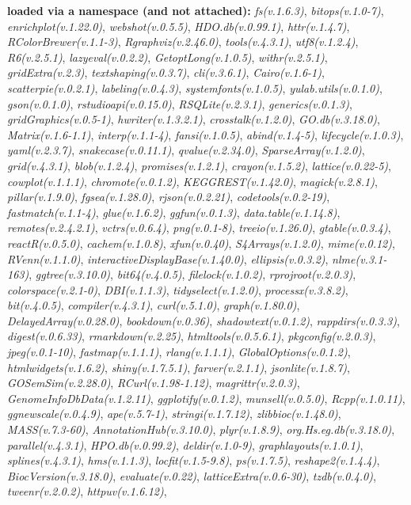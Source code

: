 \documentclass[
]{book}
\begin{document}
\textbf{loaded via a namespace (and not attached):}
\emph{fs(v.1.6.3)}, \emph{bitops(v.1.0-7)}, \emph{enrichplot(v.1.22.0)}, \emph{webshot(v.0.5.5)}, \emph{HDO.db(v.0.99.1)}, \emph{httr(v.1.4.7)}, \emph{RColorBrewer(v.1.1-3)}, \emph{Rgraphviz(v.2.46.0)}, \emph{tools(v.4.3.1)}, \emph{utf8(v.1.2.4)}, \emph{R6(v.2.5.1)}, \emph{lazyeval(v.0.2.2)}, \emph{GetoptLong(v.1.0.5)}, \emph{withr(v.2.5.1)}, \emph{gridExtra(v.2.3)}, \emph{textshaping(v.0.3.7)}, \emph{cli(v.3.6.1)}, \emph{Cairo(v.1.6-1)}, \emph{scatterpie(v.0.2.1)}, \emph{labeling(v.0.4.3)}, \emph{systemfonts(v.1.0.5)}, \emph{yulab.utils(v.0.1.0)}, \emph{gson(v.0.1.0)}, \emph{rstudioapi(v.0.15.0)}, \emph{RSQLite(v.2.3.1)}, \emph{generics(v.0.1.3)}, \emph{gridGraphics(v.0.5-1)}, \emph{hwriter(v.1.3.2.1)}, \emph{crosstalk(v.1.2.0)}, \emph{GO.db(v.3.18.0)}, \emph{Matrix(v.1.6-1.1)}, \emph{interp(v.1.1-4)}, \emph{fansi(v.1.0.5)}, \emph{abind(v.1.4-5)}, \emph{lifecycle(v.1.0.3)}, \emph{yaml(v.2.3.7)}, \emph{snakecase(v.0.11.1)}, \emph{qvalue(v.2.34.0)}, \emph{SparseArray(v.1.2.0)}, \emph{grid(v.4.3.1)}, \emph{blob(v.1.2.4)}, \emph{promises(v.1.2.1)}, \emph{crayon(v.1.5.2)}, \emph{lattice(v.0.22-5)}, \emph{cowplot(v.1.1.1)}, \emph{chromote(v.0.1.2)}, \emph{KEGGREST(v.1.42.0)}, \emph{magick(v.2.8.1)}, \emph{pillar(v.1.9.0)}, \emph{fgsea(v.1.28.0)}, \emph{rjson(v.0.2.21)}, \emph{codetools(v.0.2-19)}, \emph{fastmatch(v.1.1-4)}, \emph{glue(v.1.6.2)}, \emph{ggfun(v.0.1.3)}, \emph{data.table(v.1.14.8)}, \emph{remotes(v.2.4.2.1)}, \emph{vctrs(v.0.6.4)}, \emph{png(v.0.1-8)}, \emph{treeio(v.1.26.0)}, \emph{gtable(v.0.3.4)}, \emph{reactR(v.0.5.0)}, \emph{cachem(v.1.0.8)}, \emph{xfun(v.0.40)}, \emph{S4Arrays(v.1.2.0)}, \emph{mime(v.0.12)}, \emph{RVenn(v.1.1.0)}, \emph{interactiveDisplayBase(v.1.40.0)}, \emph{ellipsis(v.0.3.2)}, \emph{nlme(v.3.1-163)}, \emph{ggtree(v.3.10.0)}, \emph{bit64(v.4.0.5)}, \emph{filelock(v.1.0.2)}, \emph{rprojroot(v.2.0.3)}, \emph{colorspace(v.2.1-0)}, \emph{DBI(v.1.1.3)}, \emph{tidyselect(v.1.2.0)}, \emph{processx(v.3.8.2)}, \emph{bit(v.4.0.5)}, \emph{compiler(v.4.3.1)}, \emph{curl(v.5.1.0)}, \emph{graph(v.1.80.0)}, \emph{DelayedArray(v.0.28.0)}, \emph{bookdown(v.0.36)}, \emph{shadowtext(v.0.1.2)}, \emph{rappdirs(v.0.3.3)}, \emph{digest(v.0.6.33)}, \emph{rmarkdown(v.2.25)}, \emph{htmltools(v.0.5.6.1)}, \emph{pkgconfig(v.2.0.3)}, \emph{jpeg(v.0.1-10)}, \emph{fastmap(v.1.1.1)}, \emph{rlang(v.1.1.1)}, \emph{GlobalOptions(v.0.1.2)}, \emph{htmlwidgets(v.1.6.2)}, \emph{shiny(v.1.7.5.1)}, \emph{farver(v.2.1.1)}, \emph{jsonlite(v.1.8.7)}, \emph{GOSemSim(v.2.28.0)}, \emph{RCurl(v.1.98-1.12)}, \emph{magrittr(v.2.0.3)}, \emph{GenomeInfoDbData(v.1.2.11)}, \emph{ggplotify(v.0.1.2)}, \emph{munsell(v.0.5.0)}, \emph{Rcpp(v.1.0.11)}, \emph{ggnewscale(v.0.4.9)}, \emph{ape(v.5.7-1)}, \emph{stringi(v.1.7.12)}, \emph{zlibbioc(v.1.48.0)}, \emph{MASS(v.7.3-60)}, \emph{AnnotationHub(v.3.10.0)}, \emph{plyr(v.1.8.9)}, \emph{org.Hs.eg.db(v.3.18.0)}, \emph{parallel(v.4.3.1)}, \emph{HPO.db(v.0.99.2)}, \emph{deldir(v.1.0-9)}, \emph{graphlayouts(v.1.0.1)}, \emph{splines(v.4.3.1)}, \emph{hms(v.1.1.3)}, \emph{locfit(v.1.5-9.8)}, \emph{ps(v.1.7.5)}, \emph{reshape2(v.1.4.4)}, \emph{BiocVersion(v.3.18.0)}, \emph{evaluate(v.0.22)}, \emph{latticeExtra(v.0.6-30)}, \emph{tzdb(v.0.4.0)}, \emph{tweenr(v.2.0.2)}, \emph{httpuv(v.1.6.12)}, 
\end{document}
